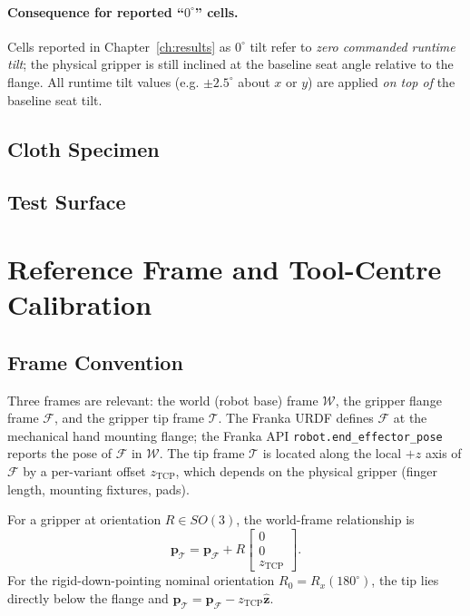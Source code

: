 \paragraph{Consequence for reported ``$0^{\circ}$'' cells.}
Cells reported in Chapter~\ref{ch:results} as $0^{\circ}$ tilt refer
to \emph{zero commanded runtime tilt}; the physical gripper is still
inclined at the baseline seat angle relative to the flange. All
runtime tilt values (e.g. $\pm 2.5^{\circ}$ about $x$ or $y$) are
applied \emph{on top of} the baseline seat tilt.

\subsection{Cloth Specimen}
\label{sec:cloth}


\subsection{Test Surface}
\label{sec:test-surface}


\section{Reference Frame and Tool-Centre Calibration}

\subsection{Frame Convention}
\label{sec:frames}

Three frames are relevant: the world (robot base) frame $\mathcal{W}$,
the gripper flange frame $\mathcal{F}$, and the gripper tip frame $\mathcal{T}$.
The Franka URDF defines $\mathcal{F}$ at the mechanical hand mounting flange;
the Franka API \texttt{robot.end\_effector\_pose} reports the pose of
$\mathcal{F}$ in $\mathcal{W}$. The tip frame $\mathcal{T}$ is located along
the local $+z$ axis of $\mathcal{F}$ by a per-variant offset $z_{\text{TCP}}$,
which depends on the physical gripper (finger length, mounting fixtures, pads).

For a gripper at orientation $R \in SO(3)$, the world-frame relationship is
\begin{equation}
  \mathbf{p}_\mathcal{T} = \mathbf{p}_\mathcal{F} + R \begin{bmatrix} 0 \\ 0 \\ z_{\text{TCP}} \end{bmatrix}.
  \label{eq:tip-from-flange}
\end{equation}
For the rigid-down-pointing nominal orientation $R_0 = R_x(180^{\circ})$,
the tip lies directly below the flange and
$\mathbf{p}_\mathcal{T} = \mathbf{p}_\mathcal{F} - z_{\text{TCP}} \hat{\mathbf{z}}$.

